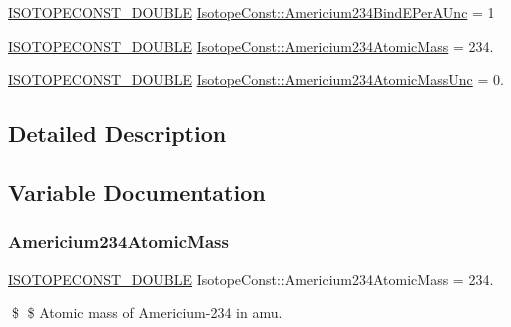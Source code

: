 \begin{DoxyCompactItemize}
\mbox{\hyperlink{group___isotope_const-_macros_ga8f45a7272ce02c0b4c65c44636ed719a}{I\+S\+O\+T\+O\+P\+E\+C\+O\+N\+S\+T\+\_\+\+D\+O\+U\+B\+LE}} \mbox{\hyperlink{group___isotope_const-_americium-_am234_ga5287f677ec51b5e252c68951fa5fae52}{Isotope\+Const\+::\+Americium234\+Bind\+E\+Per\+A\+Unc}} = 1
\item 
\mbox{\hyperlink{group___isotope_const-_macros_ga8f45a7272ce02c0b4c65c44636ed719a}{I\+S\+O\+T\+O\+P\+E\+C\+O\+N\+S\+T\+\_\+\+D\+O\+U\+B\+LE}} \mbox{\hyperlink{group___isotope_const-_americium-_am234_gacd145bafddd3170dbf65882855f69368}{Isotope\+Const\+::\+Americium234\+Atomic\+Mass}} = 234.
\item 
\mbox{\hyperlink{group___isotope_const-_macros_ga8f45a7272ce02c0b4c65c44636ed719a}{I\+S\+O\+T\+O\+P\+E\+C\+O\+N\+S\+T\+\_\+\+D\+O\+U\+B\+LE}} \mbox{\hyperlink{group___isotope_const-_americium-_am234_gaca11278c50c10aa0276232fdc339eeb2}{Isotope\+Const\+::\+Americium234\+Atomic\+Mass\+Unc}} = 0.
\end{DoxyCompactItemize}


\subsection{Detailed Description}


\subsection{Variable Documentation}
\mbox{\label{group___isotope_const-_americium-_am234_gacd145bafddd3170dbf65882855f69368}} 
\subsubsection{\texorpdfstring{Americium234\+Atomic\+Mass}{Americium234AtomicMass}}
{\footnotesize\ttfamily \mbox{\hyperlink{group___isotope_const-_macros_ga8f45a7272ce02c0b4c65c44636ed719a}{I\+S\+O\+T\+O\+P\+E\+C\+O\+N\+S\+T\+\_\+\+D\+O\+U\+B\+LE}} Isotope\+Const\+::\+Americium234\+Atomic\+Mass = 234.}

\$ \$ Atomic mass of Americium-\/234 in amu. \mbox{\label{group___isotope_const-_americium-_am234_gaca11278c50c10aa0276232fdc339eeb2}} 
